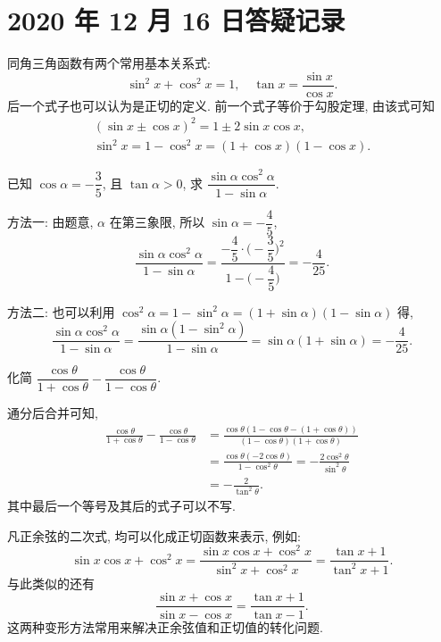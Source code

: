 \section{2020 年 12 月 16 日答疑记录}

    同角三角函数有两个常用基本关系式: 
  \[\sin^2 x+ \cos^2 x= 1,\quad 
    \tan x= \frac{\sin x}{\cos x}.\]
  后一个式子也可以认为是正切的定义. 前一个式子等价于勾股定理, 由该式可知
  \[\begin{gathered}
    (\sin x\pm \cos x)^2= 1\pm 2\sin x\cos x,\\
        \sin^2 x= 1-\cos^2 x= (1+\cos x)(1-\cos x).
  \end{gathered}\] 
  
\begin{example}
    已知 $\cos\alpha= -\dfrac35$, 且 $\tan\alpha>0$, 求 $\dfrac{\sin\alpha\cos^2\alpha}{1-\sin\alpha}$.
\end{example}
\begin{solution}
    方法一: 由题意, $\alpha$ 在第三象限, 所以 $\sin\alpha= -\dfrac45$, 
    \[\frac{\sin\alpha\cos^2\alpha}{1-\sin\alpha}
        = \frac{-\dfrac45\cdot\bigg(-\dfrac35\biggr)^2}{1- \biggl(-\dfrac45\biggr)}
        = -\frac{4}{25}.\]
    
    方法二: 也可以利用 $\cos^2\alpha= 1-\sin^2\alpha=(1+\sin\alpha)(1-\sin\alpha)$ 得,
    \[\frac{\sin\alpha\cos^2\alpha}{1-\sin\alpha}
        =\frac{\sin\alpha(1-\sin^2\alpha)}{1-\sin\alpha}
        = \sin\alpha(1+\sin\alpha)
        = -\frac{4}{25}.\]
\end{solution}

\begin{example}
    化简 $\dfrac{\cos\theta}{1+\cos\theta}- \dfrac{\cos\theta}{1-\cos\theta}$.
\end{example}
\begin{solution}
    通分后合并可知,
    \[\begin{aligned}
        \frac{\cos\theta}{1+\cos\theta}- \frac{\cos\theta}{1-\cos\theta}
        &= \frac{\cos\theta(1- \cos\theta- (1+ \cos\theta))}{(1- \cos\theta)(1+ \cos\theta)}\\
        &= \frac{\cos\theta(-2\cos\theta)}{1- \cos^2\theta}
         = -\frac{2\cos^2\theta}{\sin^2\theta}\\
        &= - \frac2{\tan^2\theta}.
    \end{aligned}\]
    其中最后一个等号及其后的式子可以不写.
\end{solution}

  凡正余弦的二次式, 均可以化成正切函数来表示, 例如:
  \[\sin x\cos x+ \cos^2 x
    = \frac{\sin x\cos x+ \cos^2 x}{\sin^2 x+ \cos^2 x}
    = \frac{\tan x+ 1}{\tan^2 x+ 1}.\]
  与此类似的还有
  \[\frac{\sin x+\cos x}{\sin x-\cos x}
    = \frac{\tan x+1}{\tan x-1}.\]
  这两种变形方法常用来解决正余弦值和正切值的转化问题.
  
